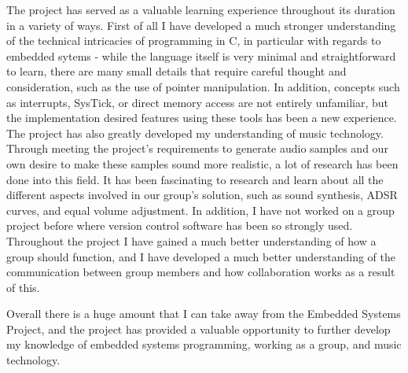 The project has served as a valuable learning experience throughout its duration
in a variety of ways. 
First of all I have developed a much stronger understanding of the technical 
intricacies of programming in C, in particular with regards to embedded sytems 
- while the language itself is very minimal and 
straightforward to learn, there are many small details that require careful 
thought and consideration, such as the use of pointer manipulation. 
In addition, concepts such as interrupts, SysTick, or direct memory access are 
not entirely unfamiliar, but the implementation desired features using 
these tools has been a new experience.
The project has also greatly developed my understanding of music technology. 
Through meeting the project's requirements to generate audio samples and our own 
desire to make these samples sound more realistic, a lot of research has been done 
into this field. It has been fascinating to research and 
learn about all the different aspects involved in our group's solution, such as 
sound synthesis, ADSR curves, and equal volume adjustment. 
In addition, I have not worked on a group project before where version control 
software has been so strongly used. Throughout the project I have gained a much 
better understanding of how a group should function, and I have developed a much 
better understanding of the communication between group members and how 
collaboration works as a result of this.  
\par\bigskip\noindent
Overall there is a huge amount that I can take away from the Embedded Systems 
Project, and the project has provided a valuable opportunity to further develop 
my knowledge of embedded systems programming, working as a group, and music 
technology. 
